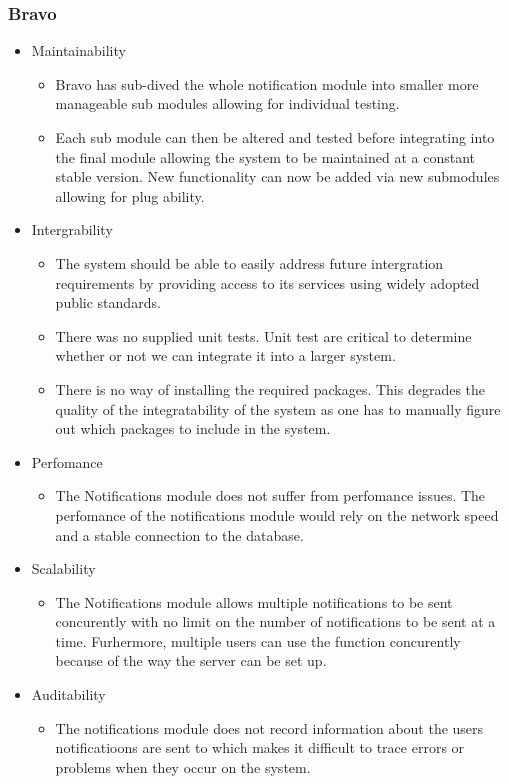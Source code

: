 \subsubsection{Bravo}
\begin{itemize}
	\item Maintainability
		\begin{itemize}
			\item Bravo has sub-dived the whole notification module into smaller more manageable sub modules allowing for individual testing. 
			\item Each sub module can then be altered and tested before integrating into the final module allowing the system to be maintained at a constant stable version. New functionality can now be added via new submodules allowing for plug ability. 												
		\end{itemize}
	\item Intergrability
		\begin{itemize}
			\item  The system should be able to easily address future intergration requirements by providing access to its services using widely adopted public standards.	 
			\item  There was no supplied unit tests. Unit test are critical to determine whether or not we can integrate it into a larger system.
			\item  There is no way of installing the required packages. This degrades the quality of the integratability of the system as one has to manually figure out which packages to include in the system.
		\end{itemize}
	\item  Perfomance
		\begin{itemize}
			\item The Notifications module does not suffer from perfomance issues. The perfomance of the notifications module would rely on the network speed  and a stable connection to the database. 
		\end{itemize}
	\item Scalability
		\begin{itemize}
			\item The Notifications module allows multiple notifications to be sent concurently with no limit on the number of notifications to be sent at a time.  Furhermore, multiple users can use the function concurently because of the way the server can be set up.	
		\end{itemize}
	\item Auditability
		\begin{itemize}
			\item  The notifications module does not record information about the users notificatioons are sent to which makes it difficult to trace errors or problems when they occur on the system.								
																

\end{itemize}
\end{itemize}
